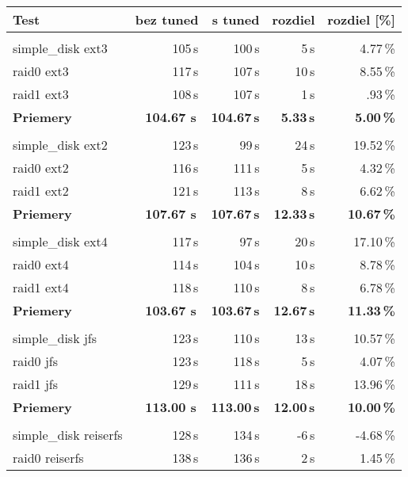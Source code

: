 \begin{table}[H]
\begin{center}
\begin{tabular}{|l|r r r r|}
    \hline
    \textbf{Test} & \textbf{bez tuned} & \textbf{s tuned} & \textbf{rozdiel} & \textbf{rozdiel [\%]} \\
    \hline & \\[-1em]\hline
    simple\_disk ext3 & 105\,s & 100\,s & 5\,s & 4.77\,\% \\
    raid0 ext3 & 117\,s & 107\,s & 10\,s & 8.55\,\% \\
    raid1 ext3 & 108\,s & 107\,s & 1\,s & .93\,\% \\
    \hline
    \textbf{Priemery} & \textbf{104.67 s}\,& \textbf{104.67\,s} & \textbf{5.33\,s} & \textbf{5.00\,\%} \\
    \hline & \\[-1em]\hline
    simple\_disk ext2 & 123\,s & 99\,s & 24\,s & 19.52\,\% \\
    raid0 ext2 & 116\,s & 111\,s & 5\,s & 4.32\,\% \\
    raid1 ext2 & 121\,s & 113\,s & 8\,s & 6.62\,\% \\
    \hline
    \textbf{Priemery} & \textbf{107.67 s}\,& \textbf{107.67\,s} & \textbf{12.33\,s} & \textbf{10.67\,\%} \\
    \hline & \\[-1em]\hline
    simple\_disk ext4 & 117\,s & 97\,s & 20\,s & 17.10\,\% \\
    raid0 ext4 & 114\,s & 104\,s & 10\,s & 8.78\,\% \\
    raid1 ext4 & 118\,s & 110\,s & 8\,s & 6.78\,\% \\
    \hline
    \textbf{Priemery} & \textbf{103.67 s}\,& \textbf{103.67\,s} & \textbf{12.67\,s} & \textbf{11.33\,\%} \\
    \hline & \\[-1em]\hline
    simple\_disk jfs & 123\,s & 110\,s & 13\,s & 10.57\,\% \\
    raid0 jfs & 123\,s & 118\,s & 5\,s & 4.07\,\% \\
    raid1 jfs & 129\,s & 111\,s & 18\,s & 13.96\,\% \\
    \hline
    \textbf{Priemery} & \textbf{113.00 s}\,& \textbf{113.00\,s} & \textbf{12.00\,s} & \textbf{10.00\,\%} \\
    \hline & \\[-1em]\hline
    simple\_disk reiserfs & 128\,s & 134\,s & -6\,s & -4.68\,\% \\
    raid0 reiserfs & 138\,s & 136\,s & 2\,s & 1.45\,\% \\

\end{tabular}
\end{center}
\end{table}
